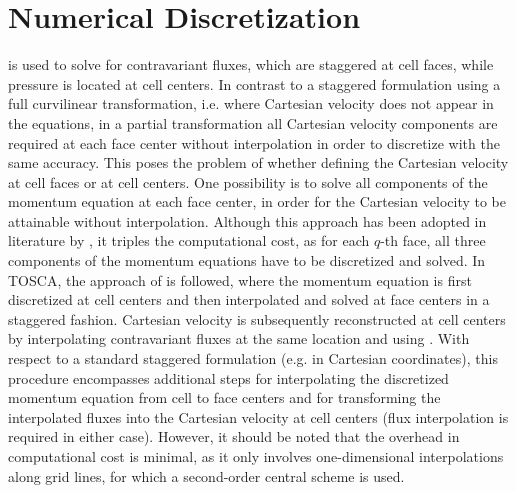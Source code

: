 \section{Numerical Discretization}
\label{sec:numericalDiscretization}

 is used to solve for contravariant fluxes, which are staggered at cell faces, while pressure is located at cell centers. In contrast to a staggered formulation using a full curvilinear transformation, i.e. where Cartesian velocity does not appear in the equations, in a partial transformation all Cartesian velocity components are required at each face center without interpolation in order to discretize  with the same accuracy. This poses the problem of whether defining the Cartesian velocity at cell faces or at cell centers. One possibility is to solve all components of the momentum equation at each face center, in order for the Cartesian velocity to be attainable without interpolation. Although this approach has been adopted in literature by \cite{MaliskaRaithby1984}, it triples the computational cost, as for each $q$-th face, all three components of the momentum equations have to be discretized and solved. In TOSCA, the approach of \cite{GeSotiropoulos2007} is followed, where the momentum equation is first discretized at cell centers and then interpolated and solved at face centers in a staggered fashion. Cartesian velocity is subsequently reconstructed at cell centers by interpolating contravariant fluxes at the same location and using . With respect to a standard staggered formulation (e.g. in Cartesian coordinates), this procedure encompasses additional steps for interpolating the discretized momentum equation from cell to face centers and for transforming the interpolated fluxes into the Cartesian velocity at cell centers (flux interpolation is required in either case). However, it should be noted that the overhead in computational cost is minimal, as it only involves one-dimensional interpolations along grid lines, for which a second-order central scheme is used.

